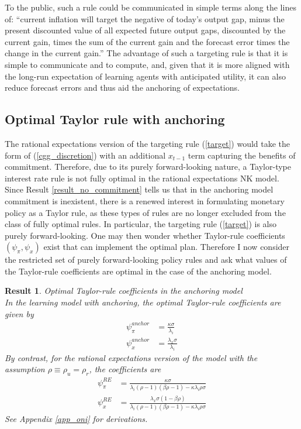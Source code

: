 \documentclass[11pt]{article}
\renewcommand{\[}{\begin{equation}}
\renewcommand{\]}{\end{equation}}
\newtheorem{result}{Result}
\begin{document}
To the public, such a rule could be communicated in simple terms along the lines of: ``current inflation will target the negative of today's output gap, minus the present discounted value of all expected future output gaps, discounted by the current gain, times the sum of the current gain and the forecast error times the change in the current gain.'' The advantage of such a targeting rule is that it is simple to communicate and to compute, and, given that it is more aligned with the long-run expectation of learning agents with anticipated utility, it can also reduce forecast errors and thus aid the anchoring of expectations. 

\subsection{Optimal Taylor rule with anchoring}
The rational expectations version of the targeting rule (\ref{target}) would take the form of (\ref{cgg_discretion}) with an additional $x_{t-1}$ term capturing the benefits of commitment. Therefore, due to its purely forward-looking nature, a Taylor-type interest rate rule is not fully optimal in the rational expectations NK model. Since Result \ref{result_no_commitment} tells us that in the anchoring model commitment is inexistent, there is a renewed interest in formulating monetary policy as a Taylor rule, as these types of rules are no longer excluded from the class of fully optimal rules. In particular, the targeting rule (\ref{target}) is also purely forward-looking. One may then wonder whether Taylor-rule coefficients $(\psi_{\pi}, \psi_x)$ exist that can implement the optimal plan. Therefore I now consider the restricted set of purely forward-looking policy rules and ask what values of the Taylor-rule coefficients are optimal in the case of the anchoring model.

\begin{result} Optimal Taylor-rule coefficients in the anchoring model \\
In the learning model with anchoring, the optimal Taylor-rule coefficients are given by
\begin{align}
\psi_{\pi}^{anchor} & = \frac{\kappa  \sigma }{\lambda_i} \label{opt_psipi_anchor}
\\
\psi_{x}^{anchor} & =  \frac{\lambda_x\sigma }{\lambda_i } \label{opt_psix_anchor}
\end{align}
By contrast, for the rational expectations version of the model with the assumption $\rho \equiv \rho_u = \rho_r$, the coefficients are
\begin{align}
\psi_{\pi}^{RE} & = \frac{\kappa  \sigma }{\lambda_i(\rho -1) (\beta  \rho -1)-\kappa  \lambda_i \rho  \sigma } \label{opt_psipi_RE}
\\
\psi_{x}^{RE} & =  \frac{\lambda_x\sigma  (1-\beta  \rho )}{\lambda_i (\rho -1) (\beta  \rho -1)-\kappa  \lambda_i \rho  \sigma } \label{opt_psix_RE}
\end{align}
See Appendix \ref{app_oni} for derivations.
\label{result_TR}
\end{result}
\end{document}
